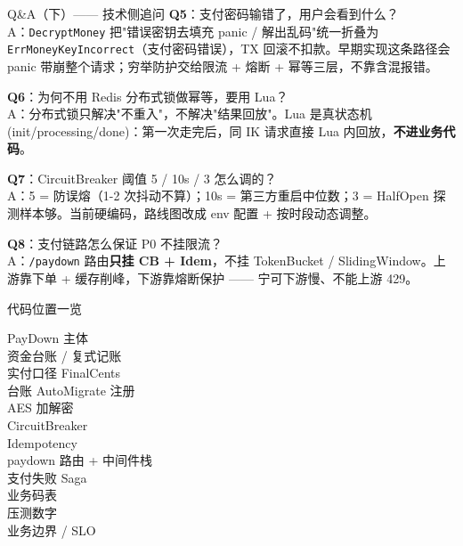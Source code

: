 \documentclass[aspectratio=169,11pt]{beamer}
\begin{document}
\begin{frame}[shrink]{Q\&A（下）—— 技术侧追问}
\small
\textbf{Q5}：支付密码输错了，用户会看到什么？\\
\hspace{4mm} A：\texttt{DecryptMoney} 把"错误密钥去填充 panic / 解出乱码"统一折叠为 \texttt{ErrMoneyKeyIncorrect}（支付密码错误），TX 回滚不扣款。早期实现这条路径会 panic 带崩整个请求；穷举防护交给限流 + 熔断 + 幂等三层，不靠含混报错。

\vspace{1mm}
\textbf{Q6}：为何不用 Redis 分布式锁做幂等，要用 Lua？\\
\hspace{4mm} A：分布式锁只解决"不重入"，不解决"结果回放"。Lua 是真状态机 (init/processing/done)：第一次走完后，同 IK 请求直接 Lua 内回放，\textbf{不进业务代码}。

\vspace{1mm}
\textbf{Q7}：CircuitBreaker 阈值 5 / 10s / 3 怎么调的？\\
\hspace{4mm} A：5 = 防误熔（1-2 次抖动不算）；10s = 第三方重启中位数；3 = HalfOpen 探测样本够。当前硬编码，路线图改成 env 配置 + 按时段动态调整。

\vspace{1mm}
\textbf{Q8}：支付链路怎么保证 P0 不挂限流？\\
\hspace{4mm} A：\texttt{/paydown} 路由\textbf{只挂 CB + Idem}，不挂 TokenBucket / SlidingWindow。上游靠下单 + 缓存削峰，下游靠熔断保护 —— 宁可下游慢、不能上游 429。
\end{frame}

\begin{frame}[shrink]{代码位置一览}
\scriptsize
\begin{description}
  \item[PayDown 主体]
  \item[资金台账 / 复式记账]
  \item[实付口径 FinalCents]
  \item[台账 AutoMigrate 注册]
  \item[AES 加解密]
  \item[CircuitBreaker]
  \item[Idempotency]
  \item[paydown 路由 + 中间件栈]
  \item[支付失败 Saga]
  \item[业务码表]
  \item[压测数字]
  \item[业务边界 / SLO]
\end{description}
\end{frame}
\end{document}
